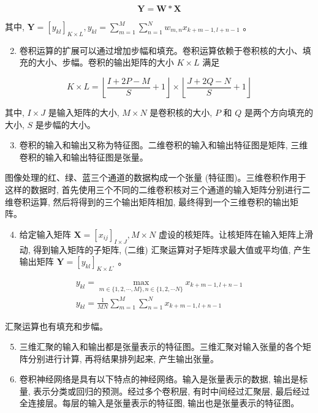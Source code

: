 \documentclass[10pt]{article}
\begin{document}
$$
\boldsymbol{Y}=\boldsymbol{W} * \boldsymbol{X}
$$

其中, $\boldsymbol{Y}=\left[y_{k l}\right]_{K \times L}, y_{k l}=\sum_{m=1}^{M} \sum_{n=1}^{N} w_{m, n} x_{k+m-1, l+n-1}$ 。

\begin{enumerate}
  \setcounter{enumi}{1}
  \item 卷积运算的扩展可以通过增加步幅和填充。卷积运算依赖于卷积核的大小、填充的大小、步幅。卷积的输出矩阵的大小 $K \times L$ 满足
\end{enumerate}

$$
K \times L=\left\lfloor\frac{I+2 P-M}{S}+1\right\rfloor \times\left\lfloor\frac{J+2 Q-N}{S}+1\right\rfloor
$$

其中, $I \times J$ 是输入矩阵的大小, $M \times N$ 是卷积核的大小, $P$ 和 $Q$ 是两个方向填充的大小, $S$ 是步幅的大小。

\begin{enumerate}
  \setcounter{enumi}{2}
  \item 卷积的输入和输出又称为特征图。二维卷积的输入和输出特征图是矩阵, 三维卷积的输入和输出特征图是张量。
\end{enumerate}

图像处理的红、绿、蓝三个通道的数据构成一个张量 (特征图)。三维卷积作用于这样的数据时, 首先使用三个不同的二维卷积核对三个通道的输入矩阵分别进行二维卷积运算, 然后将得到的三个输出矩阵相加, 最终得到一个三维卷积的输出矩阵。

\begin{enumerate}
  \setcounter{enumi}{3}
  \item 给定输入矩阵 $\boldsymbol{X}=\left[x_{i j}\right]_{I \times J}, M \times N$ 虚设的核矩阵。让核矩阵在输入矩阵上滑动, 得到输入矩阵的子矩阵, (二维) 汇聚运算对子矩阵求最大值或平均值, 产生输出矩阵 $\boldsymbol{Y}=\left[y_{k l}\right]_{K \times L^{\circ}}$ 。
\end{enumerate}

$$
\begin{gathered}
y_{k l}=\max _{m \in\{1,2, \cdots, M\}, n \in\{1,2, \cdots N\}} x_{k+m-1, l+n-1} \\
y_{k l}=\frac{1}{M N} \sum_{m=1}^{M} \sum_{n=1}^{N} x_{k+m-1, l+n-1}
\end{gathered}
$$

汇聚运算也有填充和步幅。

\begin{enumerate}
  \setcounter{enumi}{4}
  \item 三维汇聚的输入和输出都是张量表示的特征图。三维汇聚对输入张量的各个矩阵分别进行计算, 再将结果排列起来, 产生输出张量。

  \item 卷积神经网络是具有以下特点的神经网络。输入是张量表示的数据, 输出是标量, 表示分类或回归的预测。经过多个卷积层, 有时中间经过汇聚层, 最后经过全连接层。每层的输入是张量表示的特征图, 输出也是张量表示的特征图。

\end{enumerate}
\end{document}
